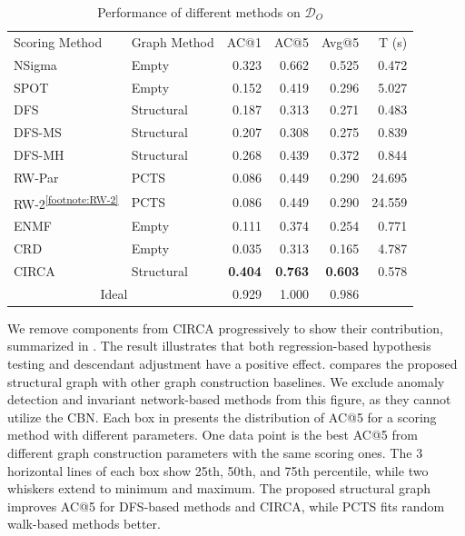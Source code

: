 \begin{table}[tb]
	\caption{Performance of different methods on $\mathcal{D}_{O}$}\label{tab:performance:oracle}
	\begin{tabular}{ll rrrr}
		\toprule
		\multirow{2}{0.12\columnwidth}{Scoring Method} & \multirow{2}{0.12\columnwidth}{Graph Method} & \multirow{2}{*}{AC@1} & \multirow{2}{*}{AC@5} & \multirow{2}{*}{Avg@5} & \multirow{2}{0.08\columnwidth}{T (s)} \\
		 & & & & & \\
		\midrule
		NSigma & Empty & 0.323 & 0.662 & 0.525 & 0.472 \\
		SPOT & Empty & 0.152 & 0.419 & 0.296 & 5.027 \\
		DFS & Structural & 0.187 & 0.313 & 0.271 & 0.483 \\
		DFS-MS & Structural & 0.207 & 0.308 & 0.275 & 0.839 \\
		DFS-MH & Structural & 0.268 & 0.439 & 0.372 & 0.844 \\
		RW-Par & PCTS & 0.086 & 0.449 & 0.290 & 24.695 \\
		RW-2\textsuperscript{\ref{footnote:RW-2}} & PCTS & 0.086 & 0.449 & 0.290 & 24.559 \\
		ENMF & Empty & 0.111 & 0.374 & 0.254 & 0.771 \\
		CRD & Empty & 0.035 & 0.313 & 0.165 & 4.787 \\
		CIRCA & Structural & \textbf{0.404} & \textbf{0.763} & \textbf{0.603} & 0.578 \\
		\midrule
        \multicolumn{2}{c}{Ideal} & 0.929 & 1.000 & 0.986 & \\ 
		\bottomrule
	\end{tabular}
\end{table}

We remove components from CIRCA progressively to show their contribution, summarized in .
The result illustrates that both regression-based hypothesis testing and descendant adjustment have a positive effect.
 compares the proposed structural graph with other graph construction baselines.
We exclude anomaly detection and invariant network-based methods from this figure, as they cannot utilize the CBN.
Each box in  presents the distribution of AC@5 for a scoring method with different parameters.
One data point is the best AC@5 from different graph construction parameters with the same scoring ones.
The 3 horizontal lines of each box show 25th, 50th, and 75th percentile, while two whiskers extend to minimum and maximum.
The proposed structural graph improves AC@5 for DFS-based methods and CIRCA, while PCTS fits random walk-based methods better.

